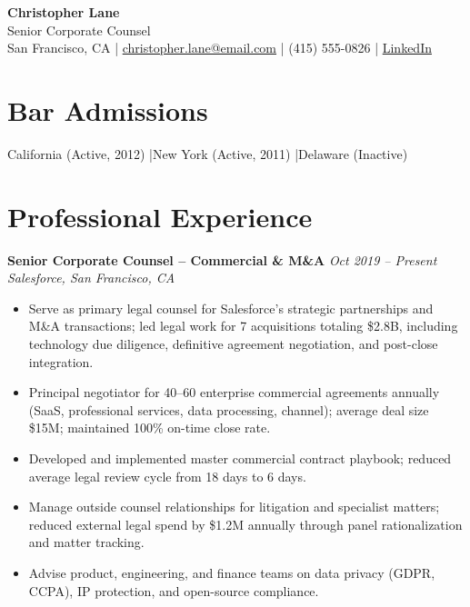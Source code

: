 \documentclass[11pt,a4paper]{article}
\begin{document}
\begin{center}
  {\LARGE \textbf{Christopher Lane}}\\[3pt]
  Senior Corporate Counsel\\[4pt]
  San Francisco, CA \quad|\quad
  \href{mailto:christopher.lane@email.com}{christopher.lane@email.com} \quad|\quad
  (415) 555-0826 \quad|\quad
  \href{https://linkedin.com/in/christopherlane-counsel}{LinkedIn}
\end{center}

\section{Bar Admissions}
California (Active, 2012) \quad|\quad New York (Active, 2011) \quad|\quad Delaware (Inactive)

\section{Professional Experience}

\noindent\textbf{Senior Corporate Counsel -- Commercial \& M\&A} \hfill \textit{Oct 2019 -- Present}\\
\textit{Salesforce, San Francisco, CA}
\begin{itemize}
  \item Serve as primary legal counsel for Salesforce's strategic partnerships and M\&A transactions; led legal work for 7 acquisitions totaling \$2.8B, including technology due diligence, definitive agreement negotiation, and post-close integration.
  \item Principal negotiator for 40--60 enterprise commercial agreements annually (SaaS, professional services, data processing, channel); average deal size \$15M; maintained 100\% on-time close rate.
  \item Developed and implemented master commercial contract playbook; reduced average legal review cycle from 18 days to 6 days.
  \item Manage outside counsel relationships for litigation and specialist matters; reduced external legal spend by \$1.2M annually through panel rationalization and matter tracking.
  \item Advise product, engineering, and finance teams on data privacy (GDPR, CCPA), IP protection, and open-source compliance.
\end{itemize}
\end{document}
